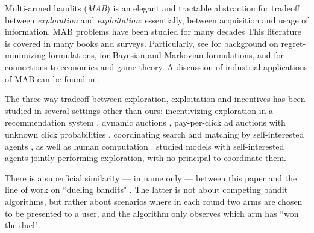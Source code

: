  Multi-armed bandits (\emph{MAB}) is an elegant and tractable abstraction for tradeoff between \emph{exploration} and \emph{exploitation}: essentially, between acquisition and usage of information. MAB problems have been studied for many decades  This literature is covered in many books and surveys. Particularly, see
\citet{Bubeck-survey12,slivkins-MABbook,LS19bandit-book} for background on regret-minimizing formulations, \citet{Gittins-book11} for Bayesian and Markovian formulations, and \citet{CesaBL-book,slivkins-MABbook} for connections to economics and game theory. A discussion of industrial applications of MAB can be found in \citep{DS-arxiv}.


The three-way tradeoff between exploration, exploitation and incentives has been studied in several settings other than ours:
incentivizing exploration in a recommendation system
    \citep[\eg][]{Che-13,Frazier-ec14,Kremer-JPE14,ICexploration-ec15,Bimpikis-exploration-ms17,Bahar-ec16,Jieming-unbiased18},
dynamic auctions
    \cite[\eg][]{AtheySegal-econometrica13,DynPivot-econometrica10,Kakade-pivot-or13},
pay-per-click ad auctions with unknown click probabilities
    \cite[\eg][]{MechMAB-ec09,DevanurK09,Transform-ec10-jacm},
coordinating search and matching by self-interested agents
    \citep{Bobby-Glen-ec16},
as well as human computation
    \cite[\eg][]{RepeatedPA-ec14,Ghosh-itcs13,Krause-www13}.
\citet{Bolton-econometrica99,Keller-econometrica05,Johari-ec12} studied models with self-interested agents jointly performing exploration, with no principal to coordinate them.

There is a superficial similarity --- in name only --- between this paper and the line of work on ``dueling bandits"
    \citep[\eg][]{Yue-dueling12,Yue-dueling-icml09}.
The latter is not about competing bandit algorithms, but rather about scenarios where in each round two arms are chosen to be presented to a user, and the algorithm only observes which arm has ``won the duel".

